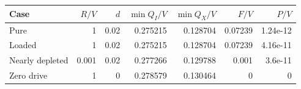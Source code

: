 \begin{tabular}{lrrrrrr}
\toprule
Case & $R/V$ & $d$ & $\min Q_I/V$ & $\min Q_X/V$ & $F/V$ & $P/V$\\
\midrule
Pure & 1 & 0.02 & 0.275215 & 0.128704 & 0.07239 & 1.24e-12 \\
Loaded & 1 & 0.02 & 0.275215 & 0.128704 & 0.07239 & 4.16e-11 \\
Nearly depleted & 0.001 & 0.02 & 0.277266 & 0.129788 & 0.001 & 3.6e-11 \\
Zero drive & 1 & 0 & 0.278579 & 0.130464 & 0 & 0 \\
\bottomrule
\end{tabular}
